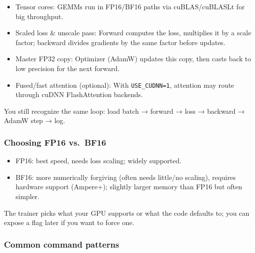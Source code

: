 \documentclass[
  letterpaper,
  DIV=11,
  numbers=noendperiod]{scrreprt}
\providecommand{\tightlist}{%
  \setlength{\itemsep}{0pt}\setlength{\parskip}{0pt}}
\begin{document}
\begin{itemize}
\tightlist
\item
  Tensor cores: GEMMs run in FP16/BF16 paths via cuBLAS/cuBLASLt for big
  throughput.
\item
  Scaled loss \& unscale pass: Forward computes the loss, multiplies it
  by a scale factor; backward divides gradients by the same factor
  before updates.
\item
  Master FP32 copy: Optimizer (AdamW) updates this copy, then casts back
  to low precision for the next forward.
\item
  Fused/fast attention (optional): With \texttt{USE\_CUDNN=1}, attention
  may route through cuDNN FlashAttention backends.
\end{itemize}

You still recognize the same loop: load batch → forward → loss →
backward → AdamW step → log.

\subsubsection{Choosing FP16 vs.~BF16}\label{choosing-fp16-vs.-bf16}

\begin{itemize}
\tightlist
\item
  FP16: best speed, needs loss scaling; widely supported.
\item
  BF16: more numerically forgiving (often needs little/no scaling),
  requires hardware support (Ampere+); slightly larger memory than FP16
  but often simpler.
\end{itemize}

The trainer picks what your GPU supports or what the code defaults to;
you can expose a flag later if you want to force one.

\subsubsection{Common command patterns}\label{common-command-patterns}
\end{document}
